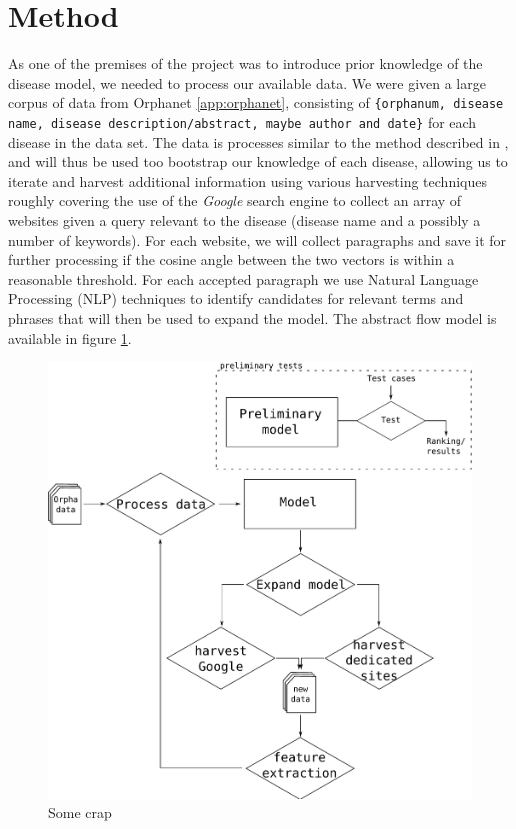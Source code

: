 \documentclass[10pt,letterpaper,draft]{article}
\begin{document}


\section{Method}
As one of the premises of the project was to introduce prior knowledge
of the disease model, we needed to process our available data. We were
given a large corpus of data from Orphanet \ref{app:orphanet},
consisting of \texttt{\{orphanum, disease name, disease
description/abstract, maybe author and date\}} for each disease in the
data set.
The data is processes similar to the method described in
\cite{jensenandersen}, and will thus be used too bootstrap our knowledge
of each disease, allowing us to iterate and harvest additional
information using various harvesting techniques roughly covering the use
of the \textit{Google} search engine to collect an array of websites
given a query relevant to the disease (disease name and a possibly a
number of keywords). For each website, we will collect paragraphs and
save it for further processing if the cosine angle between the two
vectors is within a reasonable threshold. For each accepted paragraph we
use Natural Language Processing (NLP) techniques to identify candidates
for relevant terms and phrases that will then be used to expand the
model. The abstract flow model is available in figure \ref{fig:flow}.


\begin{figure}[htp!]
\begin{center}
\includegraphics[scale=0.4]{images/pipeline}
\caption{Some crap}
\label{fig:flow}
\end{center}
\end{figure}
\end{document}
